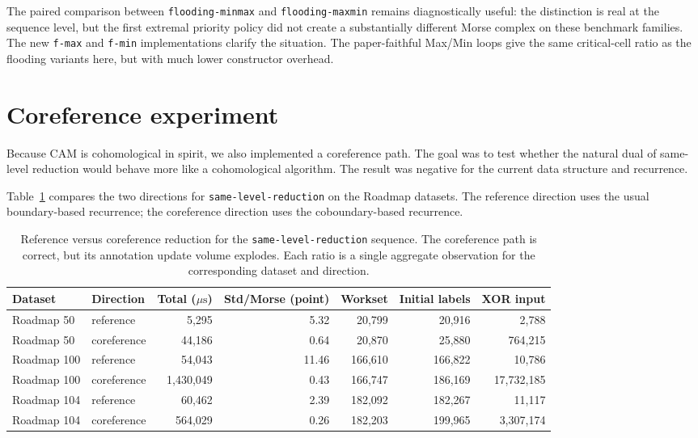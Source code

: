 \documentclass[11pt]{article}
\newcommand{\us}{\ensuremath{\mu\mathrm{s}}}
\begin{document}
The paired comparison between \texttt{flooding-minmax} and
\texttt{flooding-maxmin} remains diagnostically useful: the distinction is real at the
sequence level, but the first extremal priority policy did not create a substantially
different Morse complex on these benchmark families.  The new \texttt{f-max} and
\texttt{f-min} implementations clarify the situation.  The paper-faithful Max/Min loops
give the same critical-cell ratio as the flooding variants here, but with much lower
constructor overhead.

\section{Coreference experiment}

Because CAM is cohomological in spirit, we also implemented a coreference path.  The goal
was to test whether the natural dual of same-level reduction would behave more like a cohomological
algorithm.  The result was negative for the current data structure and recurrence.

Table~\ref{tab:coreference-roadmap} compares the two directions for \texttt{same-level-reduction}
on the Roadmap datasets.  The reference direction uses the usual boundary-based recurrence;
the coreference direction uses the coboundary-based recurrence.

\begin{table}[ht]
\centering
\scriptsize
\setlength{\tabcolsep}{2pt}
\begin{tabular}{llrrrrr}
\toprule
Dataset & Direction & Total (\us) & Std/Morse (point) & Workset & Initial labels & XOR input \\
\midrule
Roadmap 50  & reference   & 5,295    & 5.32 & 20,799  & 20,916  & 2,788 \\
Roadmap 50  & coreference & 44,186   & 0.64 & 20,870  & 25,880  & 764,215 \\
\midrule
Roadmap 100 & reference   & 54,043   & 11.46 & 166,610 & 166,822 & 10,786 \\
Roadmap 100 & coreference & 1,430,049 & 0.43 & 166,747 & 186,169 & 17,732,185 \\
\midrule
Roadmap 104 & reference   & 60,462   & 2.39 & 182,092 & 182,267 & 11,117 \\
Roadmap 104 & coreference & 564,029  & 0.26 & 182,203 & 199,965 & 3,307,174 \\
\bottomrule
\end{tabular}
\caption{Reference versus coreference reduction for the \texttt{same-level-reduction} sequence.
The coreference path is correct, but its annotation update volume explodes.  Each ratio is
a single aggregate observation for the corresponding dataset and direction.}
\label{tab:coreference-roadmap}
\end{table}
\end{document}
